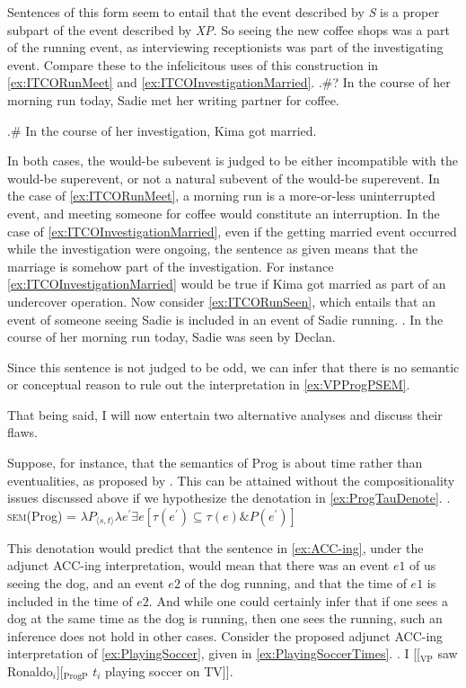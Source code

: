 Sentences of this form seem to entail that the event described by \textit{S} is a proper subpart of the event described by \textit{XP}.
So seeing the new coffee shops was a part of the running event, as interviewing receptionists was part of the investigating event.
Compare these to the infelicitous uses of this construction in \cref{ex:ITCORunMeet} and \cref{ex:ITCOInvestigationMarried}.
\ex.\#? In the course of her morning run today, Sadie met her writing partner for coffee.\label{ex:ITCORunMeet}

\ex.\# In the course of her investigation, Kima got married.\label{ex:ITCOInvestigationMarried}

In both cases, the would-be subevent is judged to be either incompatible with the would-be superevent, or not a natural subevent of the would-be superevent.
In the case of \cref{ex:ITCORunMeet}, a morning run is a more-or-less uninterrupted event, and meeting someone for coffee would constitute an interruption.
In the case of \cref{ex:ITCOInvestigationMarried}, even if the getting married event occurred while the investigation were ongoing, the sentence as given means that the marriage is somehow part of the investigation.
For instance \cref{ex:ITCOInvestigationMarried} would be true if Kima got married as part of an undercover operation.
Now consider \cref{ex:ITCORunSeen}, which entails that an event of someone seeing Sadie is included in an event of Sadie running.
\ex.\label{ex:ITCORunSeen} In the course of her morning run today, Sadie was seen by Declan.

Since this sentence is not judged to be odd, we can infer that there is no semantic or conceptual reason to rule out the interpretation in \cref{ex:VPProgPSEM}.

That being said, I will now entertain two alternative analyses and discuss their flaws.

Suppose, for instance, that the semantics of Prog is about time rather than eventualities, as proposed by \textcite{klein1994time}.
This can be attained without the compositionality issues discussed above if we hypothesize the denotation in \cref{ex:ProgTauDenote}.
\ex.\label{ex:ProgTauDenote} \textsc{sem}(Prog) = $\lambda P_{\langle s,t\rangle} \lambda e^{\prime} \exists e [\tau(e^{\prime}) \subseteq \tau(e) \& P(e^{\prime})]$

This denotation would predict that the sentence in \cref{ex:ACC-ing}, under the adjunct ACC-ing interpretation, would mean that there was an event $e1$ of us seeing the dog, and an event $e2$ of the dog running, and that the time of $e1$ is included in the time of $e2$.
And while one could certainly infer that if one sees a dog at the same time as the dog is running, then one sees the running, such an inference does not hold in other cases.
Consider the proposed adjunct ACC-ing interpretation of \cref{ex:PlayingSoccer}, given in \cref{ex:PlayingSoccerTimes}.
\ex.\label{ex:PlayingSoccer} I [[$_{\text{VP}}$ saw Ronaldo$_{i}$][$_{\text{ProgP}}$ $t_{i}$ playing soccer on TV]].

